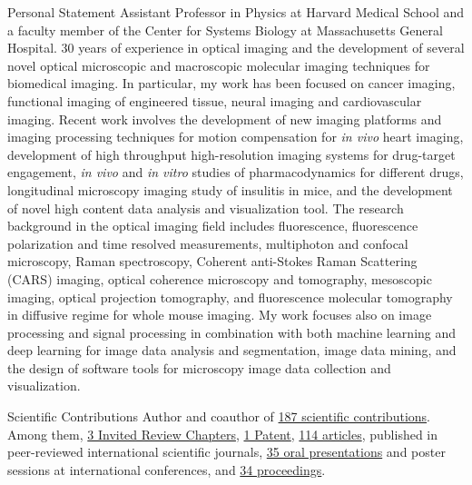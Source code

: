 \documentclass{resume}
\begin{document}
\begin{category}{Personal Statement}
\citemnobullet 
 Assistant Professor in Physics at Harvard Medical School and a faculty member of the Center for Systems Biology at Massachusetts General Hospital. 30 years of experience in optical imaging and the development of several novel optical microscopic and macroscopic molecular imaging techniques for biomedical imaging. In particular, my work has been focused on cancer imaging, functional imaging of engineered tissue, neural imaging and cardiovascular imaging. Recent work involves the development of new imaging platforms and imaging processing techniques for motion compensation for {\it in vivo} heart imaging, development of high throughput high-resolution imaging systems for drug-target engagement, {\it in vivo} and {\it in vitro} studies of pharmacodynamics for different drugs, longitudinal microscopy imaging study of insulitis in mice, and the development of novel high content data analysis and visualization tool. The research background in the optical imaging field includes fluorescence, fluorescence polarization and time resolved measurements, multiphoton and confocal microscopy, Raman spectroscopy, Coherent anti-Stokes Raman Scattering (CARS) imaging, optical coherence microscopy and tomography, mesoscopic imaging, optical projection tomography, and fluorescence molecular tomography in diffusive regime for whole mouse imaging.  
My work focuses also on image processing and signal processing in combination with both machine learning and deep learning for image data analysis and segmentation, image data mining, and the design of software tools for microscopy image data collection and visualization. 


\end{category}
%
%
\begin{category}{Scientific Contributions}
\citemnobullet 
Author and coauthor of \href{https://cvinegoni.github.io/diffpubs}{187 scientific contributions}.
Among them, \href{https://cvinegoni.github.io/books/}{3 Invited Review
Chapters}, \href{https://cvinegoni.github.io/patents/}{1 Patent},  \href{https://cvinegoni.github.io/papers/}{114
articles},
 published in peer-reviewed international scientific
journals, \href{https://cvinegoni.github.io/proceedings/\#conferences}{35 oral
presentations}
and poster sessions at international conferences, and
\href{https://cvinegoni.github.io/proceedings/\#proceedings-papers}{34
proceedings}.
\end{category}
\end{document}
